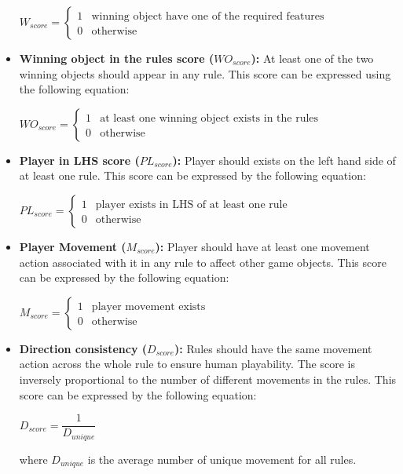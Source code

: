 \begin{itemize}
\begin{center}
	$W_{score}= \begin{cases}
	               1 & \text{winning object have one of the required features}\\
	               0 & \text{otherwise}
	           \end{cases}$
	\end{center}	
	\item \textbf{Winning object in the rules score ($WO_{score}$):} At least one of the two winning objects should appear in any rule. This score can be expressed using the following equation:
	\begin{center}
	$WO_{score}= \begin{cases}
	               1 & \text{at least one winning object exists in the rules}\\
	               0 & \text{otherwise}
	           \end{cases}$
	\end{center}
	\item \textbf{Player in LHS score ($PL_{score}$):} Player should exists on the left hand side of at least one rule. This score can be expressed by the following equation:
	\begin{center}
	$PL_{score}= \begin{cases}
	               1 & \text{player exists in LHS of at least one rule}\\
	               0 & \text{otherwise}
	           \end{cases}$
	\end{center}	
	\item \textbf{Player Movement ($M_{score}$):} Player should have at least one movement action associated with it in any rule to affect other game objects. This score can be expressed by the following equation:
	\begin{center}
	$M_{score}= \begin{cases}
	               1 & \text{player movement exists}\\
	               0 & \text{otherwise}
	           \end{cases}$
	\end{center}	
	\item \textbf{Direction consistency ($D_{score}$):} Rules should have the same movement action across the whole rule to ensure human playability. The score is inversely proportional to the number of different movements in the rules. This score can be expressed by the following equation:
	\begin{center}
	$D_{score} = \dfrac{1}{D_{unique}}$
	\end{center}
	where $D_{unique}$ is the average number of unique movement for all rules.
\end{itemize}
